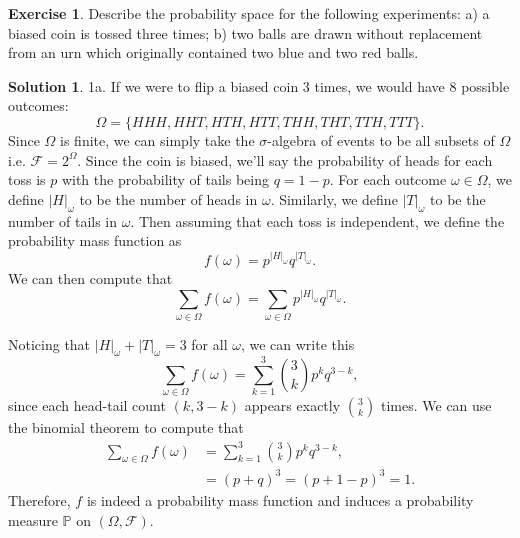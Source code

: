 \documentclass[12pt]{article}
\newcommand{\Prob}{\mathbb{P}}
\newcommand{\calF}{\mathcal{F}}
\newcommand{\abs}[1]{ \left| #1 \right| }
\theoremstyle{definition}
\newtheorem{exer}{Exercise}
\newtheorem{sol}{Solution}
\theoremstyle{remark}
\begin{document}
\begin{exer}
Describe the probability space for the following experiments: a) a biased coin is tossed three times; b)  two balls are drawn without replacement from an urn which originally contained two blue and two red balls.
\end{exer}

\begin{sol}\leavevmode

    1a. If we were to flip a biased coin 3 times, we would have 8 possible outcomes:
\begin{equation}
    \Omega = \{HHH, HHT, HTH, HTT, THH, THT, TTH, TTT \}.
\end{equation}
Since $\Omega$ is finite, we can simply take the $\sigma$-algebra of events to be all subsets of $\Omega$ i.e. $\calF = 2^\Omega$. Since the coin is biased, we'll say the probability of heads for each toss is $p$ with the probability of tails being $q=1-p$. For each outcome $\omega\in\Omega$, we define $\abs{H}_\omega$ to be the number of heads in $\omega$. Similarly, we define $\abs{T}_\omega$ to be the number of tails in $\omega$. Then assuming that each toss is independent, we define the probability mass function as
\begin{equation}
    f(\omega) = p^{\abs{H}_\omega}q^{\abs{T}_\omega}.
\end{equation}
We can then compute that
\begin{equation}
    \sum_{\omega\in\Omega} f(\omega) = \sum_{\omega\in\Omega} p^{\abs{H}_\omega}q^{\abs{T}_\omega}.
\end{equation}

Noticing that $\abs{H}_\omega + \abs{T}_\omega = 3$ for all $\omega$, we can write this 
\begin{equation} 
    \sum_{\omega\in\Omega} f(\omega) = \sum_{k=1}^{3} \binom{3}{k} p^{k}q^{3-k},
\end{equation}
since each head-tail count $(k,3-k)$ appears exactly $\binom{3}{k}$ times. We can use the binomial theorem to compute that
\begin{align}
    \sum_{\omega\in\Omega} f(\omega) &= \sum_{k=1}^{3} \binom{3}{k} p^{k}q^{3-k},\\
                                     &= (p + q)^3 = (p + 1 - p)^3 = 1.
\end{align} Therefore, $f$ is indeed a probability mass function and induces a probability measure $\Prob$ on $(\Omega, \calF)$.
\vspace{1in}


\end{sol}
\end{document}
